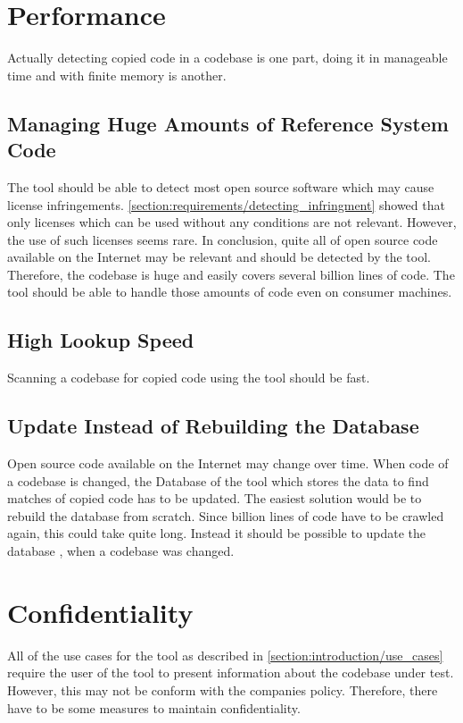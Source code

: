\section{Performance}
Actually detecting copied code in a codebase is one part, doing it in manageable time and with finite memory is another.

\subsection{Managing Huge Amounts of Reference System Code}
The tool should be able to detect most open source software which may cause license infringements.
\autoref{section:requirements/detecting_infringment} showed that only licenses which can be used without any conditions are not relevant.
However, the use of such licenses seems rare.
In conclusion, quite all of open source code available on the Internet may be relevant and should be detected by the tool.
Therefore, the codebase is huge and easily covers several billion lines of code.
The tool should be able to handle those amounts of code even on consumer machines. %

\subsection{High Lookup Speed}
Scanning a codebase for copied code using the tool should be fast. %

\subsection{Update Instead of Rebuilding the Database}
Open source code available on the Internet may change over time.
When code of a codebase is changed, the Database of the tool which stores the data to find matches of copied code has to be updated.
The easiest solution would be to rebuild the database from scratch.
Since billion lines of code have to be crawled again, this could take quite long.
Instead it should be possible to update the database , when a codebase was changed.

\section{Confidentiality}
All of the use cases for the tool as described in \autoref{section:introduction/use_cases} require the user of the tool to present information about the codebase under test.
However, this may not be conform with the companies policy.
Therefore, there have to be some measures to maintain confidentiality.

